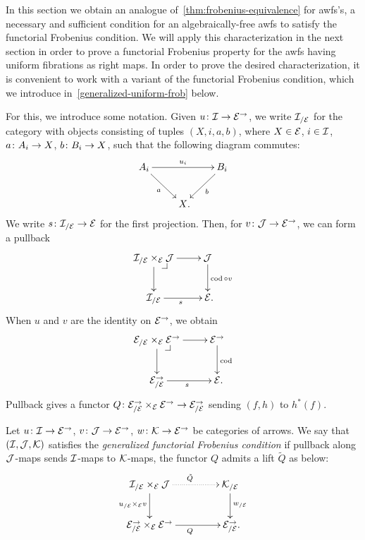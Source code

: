 \documentclass[reqno,10pt,a4paper,oneside,draft]{amsart}
\begin{document}
{{In this section we obtain an analogue of~\cref{thm:frobenius-equivalence} for awfs's, \ie a necessary and sufficient condition for an algebraically-free awfs to satisfy the functorial Frobenius condition.
We will apply this characterization in the next section in order to prove a functorial Frobenius property for the awfs having uniform fibrations as right maps.
In order to prove the desired characterization, it is convenient to work with a variant of the functorial Frobenius condition, which we introduce in~\cref{generalized-uniform-frob} below.

For this, we introduce some notation.
Given $u \co \cal{I} \to \cal{E}^\to$, we write $\cal{I}_{/\cal{E}}$ for the category with objects consisting of 
tuples $(X, i, a, b)$, where $X \in \cal{E}$, $i \in \cal{I}$, $a \co A_i \to X$, $b \co B_i \to X$, such that the following diagram commutes:
\[
\xymatrix{
A_i \ar[dr]_a \ar[rr]^{u_i} & & B_i \ar[dl]^{b} \\
 & X \rlap{.} & }
\]
We write $s \co \cal{I}_{/\cal{E}} \to \cal{E}$ for the first projection.
Then, for $v \co \cal{J} \to \cal{E}^\to$, we can form a pullback
\[
\xymatrix{
  \cal{I}_{/\cal{E}} \times_{\cal{E}} \cal{J}
  \ar[r]
  \ar[d]
  \pullback{dr}
&
  \cal{J}
  \ar[d]^{\cod \cc v}
\\
  \cal{I}_{/\cal{E}}
  \ar[r]_s
&
  \cal{E}
\rlap{.}}
\]
When $u$ and $v$ are the identity on $\cal{E}^\to$, we obtain
\[
\xymatrix{
  \cal{E}_{/\cal{E}} \times_{\cal{E}} \cal{E}^\to
  \ar[r]
  \ar[d]
  \pullback{dr}
&
  \cal{E}^\to
  \ar[d]^{\cod}
\\
  \cal{E}^\to_{/\cal{E}}
  \ar[r]_s
&
  \cal{E}
\rlap{.}}
\]
Pullback gives a functor $Q \co  \cal{E}^\to_{/\cal{E}} \times_{\cal{E}} \cal{E}^\to \to \cal{E}_{/\cal{E}}^\to$ sending 
$(f, h)$  to $h^*(f)$. 

\begin{definition} \label{generalized-uniform-frob}
Let $u \co \cal{I} \to \cal{E}^\to$, $v \co \cal{J} \to \cal{E}^\to$, $w \co \cal{K} \to \catE^\to$ be categories of arrows.
We say that $(\cal{I}, \cal{J}, \cal{K})$ satisfies the \emph{generalized functorial Frobenius condition} if pullback along $\cal{J}$-maps sends $\cal{I}$-maps to $\cal{K}$-maps, \ie the functor $Q$ admits a lift $\tilde{Q}$ as below:
\begin{equation} \label{generalized-uniform-frob:lift}
\begin{gathered}
\xymatrix@C+2em{
  \cal{I}_{/\cal{E}} \times_{\cal{E}} \cal{J}
  \ar@{.>}[r]^{\tilde{Q}}
  \ar[d]_{u_{/\cal{E}} \times_{\cal{E}} v}
&
  \cal{K}_{/\cal{E}}
  \ar[d]^{w_{/\cal{E}}}
\\
  \cal{E}^\to_{/\cal{E}} \times_{\cal{E}} \cal{E}^\to
  \ar[r]_{Q}
&
  \cal{E}_{/\cal{E}}^\to
\rlap{.}}
\end{gathered}
\end{equation}
\end{definition}

}}
\end{document}
